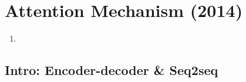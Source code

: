 \chapter{Attention Mechanism (2014)}

\begin{tcolorbox}
\end{tcolorbox}

\begin{enumerate}
    \item 
\end{enumerate}


\section{Intro: Encoder-decoder \& Seq2seq}

